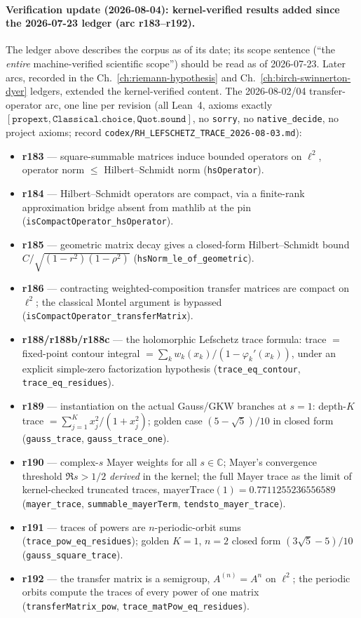 \paragraph{Verification update (2026-08-04): kernel-verified results added since the 2026-07-23 ledger (arc r183--r192).}
The ledger above describes the corpus as of its date; its scope sentence
(``the \emph{entire} machine-verified scientific scope'') should be read as of
2026-07-23. Later arcs, recorded in the Ch.~\ref{ch:riemann-hypothesis} and
Ch.~\ref{ch:birch-swinnerton-dyer} ledgers, extended the kernel-verified
content. The 2026-08-02/04 transfer-operator arc, one line per revision (all
Lean~4, axioms exactly $[\texttt{propext}, \texttt{Classical.choice},
\texttt{Quot.sound}]$, no \texttt{sorry}, no \texttt{native\_decide}, no
project axioms; record \texttt{codex/RH\_LEFSCHETZ\_TRACE\_2026-08-03.md}):
\begin{itemize}
\item \textbf{r183} --- square-summable matrices induce bounded operators on $\ell^2$, operator norm $\le$ Hilbert--Schmidt norm (\texttt{hsOperator}).
\item \textbf{r184} --- Hilbert--Schmidt operators are compact, via a finite-rank approximation bridge absent from mathlib at the pin (\texttt{isCompactOperator\_hsOperator}).
\item \textbf{r185} --- geometric matrix decay gives a closed-form Hilbert--Schmidt bound $C/\sqrt{(1-r^2)(1-\rho^2)}$ (\texttt{hsNorm\_le\_of\_geometric}).
\item \textbf{r186} --- contracting weighted-composition transfer matrices are compact on $\ell^2$; the classical Montel argument is bypassed (\texttt{isCompactOperator\_transferMatrix}).
\item \textbf{r188/r188b/r188c} --- the holomorphic Lefschetz trace formula: trace $=$ fixed-point contour integral $= \sum_k w_k(x_k)/(1-\varphi_k'(x_k))$, under an explicit simple-zero factorization hypothesis (\texttt{trace\_eq\_contour}, \texttt{trace\_eq\_residues}).
\item \textbf{r189} --- instantiation on the actual Gauss/GKW branches at $s=1$: depth-$K$ trace $= \sum_{j=1}^{K} x_j^2/(1+x_j^2)$; golden case $(5-\sqrt{5})/10$ in closed form (\texttt{gauss\_trace}, \texttt{gauss\_trace\_one}).
\item \textbf{r190} --- complex-$s$ Mayer weights for all $s\in\mathbb{C}$; Mayer's convergence threshold $\Re s > 1/2$ \emph{derived} in the kernel; the full Mayer trace as the limit of kernel-checked truncated traces, $\mathrm{mayerTrace}(1) = 0.7711255236556589$ (\texttt{mayer\_trace}, \texttt{summable\_mayerTerm}, \texttt{tendsto\_mayer\_trace}).
\item \textbf{r191} --- traces of powers are $n$-periodic-orbit sums (\texttt{trace\_pow\_eq\_residues}); golden $K{=}1$, $n{=}2$ closed form $(3\sqrt{5}-5)/10$ (\texttt{gauss\_square\_trace}).
\item \textbf{r192} --- the transfer matrix is a semigroup, $A^{(n)} = A^n$ on $\ell^2$; the periodic orbits compute the traces of every power of one matrix (\texttt{transferMatrix\_pow}, \texttt{trace\_matPow\_eq\_residues}).
\end{itemize}
